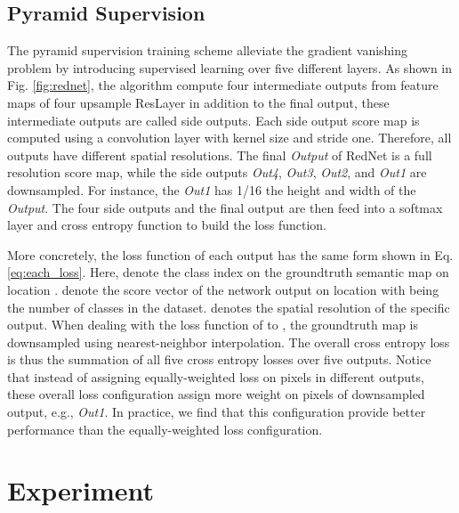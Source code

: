 \documentclass[runningheads]{llncs}
\begin{document}
\subsection{Pyramid Supervision}
The pyramid supervision training scheme alleviate the gradient vanishing problem by introducing supervised learning over five different layers. As shown in Fig. \ref{fig:rednet}, the algorithm compute four intermediate outputs from feature maps of four upsample ResLayer in addition to the final output, these intermediate outputs are called side outputs. Each side output score map is computed using a convolution layer with  kernel size and stride one. Therefore, all outputs have different spatial resolutions. The final \textit{Output} of RedNet is a full resolution score map, while the side outputs \textit{Out4}, \textit{Out3}, \textit{Out2}, and \textit{Out1} are downsampled. For instance, the \textit{Out1} has 1/16 the height and width of the \textit{Output}. The four side outputs and the final output are then feed into a softmax layer and cross entropy function to build the loss function. 



More concretely, the loss function of each output has the same form shown in Eq. \ref{eq:each_loss}. Here,  denote the class index on the groundtruth semantic map on location .  denote the score vector of the network output on location  with  being the number of classes in the dataset.  denotes the spatial resolution of the specific output. When dealing with the loss function of  to , the groundtruth map  is downsampled using nearest-neighbor interpolation. The overall cross entropy loss is thus the summation of all five cross entropy losses over five outputs. Notice that instead of assigning equally-weighted loss on pixels in different outputs, these overall loss configuration assign more weight on pixels of downsampled output, e.g., \textit{Out1}. In practice, we find that this configuration provide better performance than the equally-weighted loss configuration. 

\section{Experiment} \label{sec:experiment}
\end{document}
